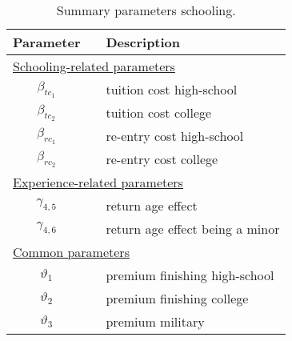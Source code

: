 \begin{table}[h]
\caption{Summary parameters schooling.}
\label{tab:ParametersSchooling}
\vspace{5pt}
\centering
\setlength\extrarowheight{2.5pt}
\begin{tabular}{@{}cll@{}}
\toprule
Parameter            &  &  \multicolumn{1}{l}{Description}              \\ \midrule
\multicolumn{3}{l}{\underline{Schooling-related parameters}}            \\[5pt]
$\beta_{tc_1}$       &  & tuition cost high-school                      \\
$\beta_{tc_2}$       &  & tuition cost college                          \\
$\beta_{rc_1}$       &  & re-entry cost high-school                     \\
$\beta_{rc_2}$       &  & re-entry cost college                         \\[7.5pt]
\multicolumn{3}{l}{\underline{Experience-related parameters}}           \\[5pt]
$\gamma_{4,5}$       &  & return age effect                             \\
$\gamma_{4,6}$       &  & return age effect being a minor               \\[7.5pt]
\multicolumn{3}{l}{\underline{Common parameters}}                 \\[5pt]
$\vartheta_1$        &  & premium finishing high-school                 \\
$\vartheta_2$        &  & premium finishing college                     \\
$\vartheta_3$        &  & premium military                              \\[7.5pt]
\bottomrule
\end{tabular}
\end{table}
